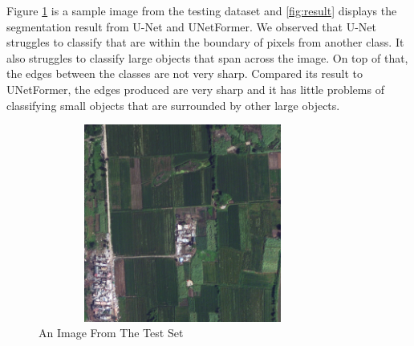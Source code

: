 Figure \ref{fig:train} is a sample image from the testing dataset and \ref{fig:result} displays the segmentation result from U-Net and UNetFormer. We observed that U-Net struggles to classify that are within the boundary of pixels from another class. It also struggles to classify large objects that span across the image. On top of that, the edges between the classes are not very sharp. Compared its result to UNetFormer, the edges produced are very sharp and it has little problems of classifying small objects that are surrounded by other large objects.
\FloatBarrier
\begin{figure}[!h]
\includegraphics[width=9.5cm, height=6.5cm]{images/3592.png}
\centering
\caption{An Image From The Test Set}
\label{fig:train}
\end{figure}
